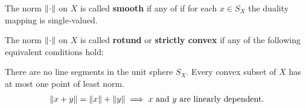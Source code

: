 \begin{definition}\label{def:smooth_norm}\cite[Definition 2.36]{Phelps1993}
  The norm \( \left\Vert \cdot \right\Vert \) on \( X \) is called \textbf{smooth} if any of  if for each \( x \in S_X \) the duality mapping is single-valued.
\end{definition}

\begin{definition}\label{def:rotund_norm}\cite[Definition 2.36]{Phelps1993}
  The norm \( \left\Vert \cdot \right\Vert \) on \( X \) is called \textbf{rotund} or \textbf{strictly convex} if any of the following equivalent conditions hold:
  \begin{defenum}
     There are no line segments in the unit sphere \( S_X \).
     Every convex subset of \( X \) has at most one point of least norm.
    \begin{align}\label{def:rotund_norm/linearly_dependent/equation}
      \left\Vert x + y \right\Vert = \left\Vert x \right\Vert + \left\Vert y \right\Vert \implies x \text{ and } y \text{ are linearly dependent}.
    \end{align}
  \end{defenum}
\end{definition}
